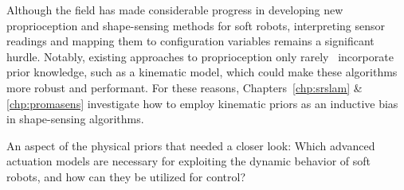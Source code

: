 %
Although the field has made considerable progress in developing new proprioception and shape-sensing methods for soft robots, interpreting sensor readings and mapping them to configuration variables remains a significant hurdle. Notably, existing approaches to proprioception only rarely~\citep{stella2023soft} incorporate prior knowledge, such as a kinematic model, which could make these algorithms more robust and performant.
%
For these reasons, Chapters~\ref{chp:srslam} \& \ref{chp:promasens} investigate how to employ kinematic priors as an inductive bias in shape-sensing algorithms. 

\begin{researchquestion}\label{rq:actuation_models}
    An aspect of the physical priors that needed a closer look: Which advanced actuation models are necessary for exploiting the dynamic behavior of soft robots, and how can they be utilized for control?
\end{researchquestion}

